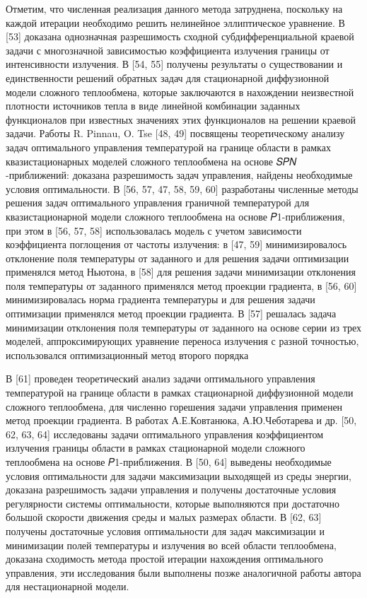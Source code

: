 Отметим, что численная реализация данного метода затруднена, поскольку на каждой итерации необходимо решить
нелинейное эллиптическое уравнение.
В [53] доказана однозначная разрешимость сходной субдифференциальной краевой задачи с многозначной
зависимостью коэффициента излучения границы от интенсивности излучения.
В [54, 55] получены результаты о существовании и единственности решений обратных задач для стационарной диффузионной
модели сложного теплообмена, которые заключаются в нахождении неизвестной плотности источников тепла в виде линейной
комбинации заданных функционалов при известных значениях этих функционалов на решении краевой задачи.
Работы R. Pinnau, O. Tse [48, 49] посвящены теоретическому анализу задач оптимального управления температурой на границе
области в рамках квазистационарных моделей сложного теплообмена на основе
𝑆𝑃𝑁 -приближений: доказана разрешимость задач управления, найдены необходимые условия оптимальности.
В [56, 57, 47, 58, 59, 60] разработаны численные методы решения задач оптимального управления граничной температурой
для квазистационарной модели сложного теплообмена на основе 𝑃1-приближения,
при этом в [56, 57, 58] использовалась модель с учетом зависимости коэффициента поглощения от частоты излучения:
в [47, 59] минимизировалось отклонение поля температуры от заданного и для решения задачи оптимизации применялся метод Ньютона,
в [58] для решения задачи минимизации отклонения поля температуры от заданного применялся метод проекции градиента, в [56,
60] минимизировалась норма градиента температуры и для решения задачи
оптимизации применялся метод проекции градиента.
В [57] решалась задача минимизации отклонения поля температуры от заданного на основе серии из
трех моделей, аппроксимирующих уравнение переноса излучения с разной точностью,
использовался оптимизационный метод второго порядка


В [61] проведен теоретический анализ задачи оптимального управления
температурой на границе области в рамках стационарной диффузионной модели
сложного теплообмена, для численно горешения задачи управления применен
метод проекции градиента.
В работах А.Е.Ковтанюка, А.Ю.Чеботарева и др. [50, 62, 63, 64] исследованы задачи оптимального управления коэффициентом
излучения границы области в рамках стационарной модели сложного теплообмена на основе 𝑃1-приближения.
В [50, 64] выведены необходимые условия оптимальности для задачи максимизации выходящей из среды энергии,
доказана разрешимость задачи управления и получены достаточные условия регулярности системы оптимальности,
которые выполняются при достаточно большой скорости движения среды и малых размерах области.
В [62, 63] получены достаточные условия оптимальности для задач максимизации и минимизации полей температуры и излучения
во всей области теплообмена, доказана сходимость метода простой итерации нахождения оптимального управления,
эти исследования были выполнены позже аналогичной работы автора для нестационарной модели.


